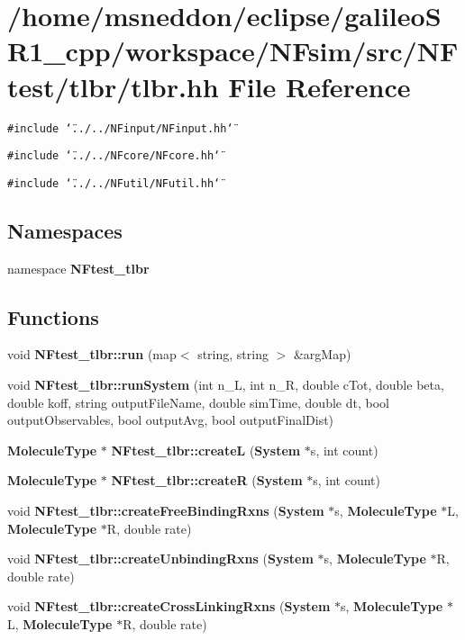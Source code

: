 \section{/home/msneddon/eclipse/galileoSR1\_\-cpp/workspace/NFsim/src/NFtest/tlbr/tlbr.hh File Reference}
\label{tlbr_8hh}


{\tt \#include \char`\"{}../../NFinput/NFinput.hh\char`\"{}}\par
{\tt \#include \char`\"{}../../NFcore/NFcore.hh\char`\"{}}\par
{\tt \#include \char`\"{}../../NFutil/NFutil.hh\char`\"{}}\par
\subsection*{Namespaces}
\begin{CompactItemize}
\item 
namespace {\bf NFtest\_\-tlbr}
\end{CompactItemize}
\subsection*{Functions}
\begin{CompactItemize}
\item 
void {\bf NFtest\_\-tlbr::run} (map$<$ string, string $>$ \&argMap)
\item 
void {\bf NFtest\_\-tlbr::runSystem} (int n\_\-L, int n\_\-R, double cTot, double beta, double koff, string outputFileName, double simTime, double dt, bool outputObservables, bool outputAvg, bool outputFinalDist)
\item 
{\bf MoleculeType} $\ast$ {\bf NFtest\_\-tlbr::createL} ({\bf System} $\ast$s, int count)
\item 
{\bf MoleculeType} $\ast$ {\bf NFtest\_\-tlbr::createR} ({\bf System} $\ast$s, int count)
\item 
void {\bf NFtest\_\-tlbr::createFreeBindingRxns} ({\bf System} $\ast$s, {\bf MoleculeType} $\ast$L, {\bf MoleculeType} $\ast$R, double rate)
\item 
void {\bf NFtest\_\-tlbr::createUnbindingRxns} ({\bf System} $\ast$s, {\bf MoleculeType} $\ast$R, double rate)
\item 
void {\bf NFtest\_\-tlbr::createCrossLinkingRxns} ({\bf System} $\ast$s, {\bf MoleculeType} $\ast$L, {\bf MoleculeType} $\ast$R, double rate)
\end{CompactItemize}
